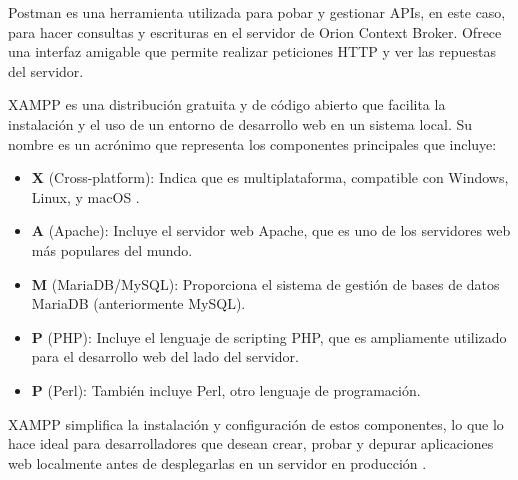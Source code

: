
\begin{comment}
Esta parte de la memoria tiene como objetivo presentar las técnicas metodológicas y las herramientas de desarrollo que se han utilizado para llevar a cabo el proyecto. Si se han estudiado diferentes alternativas de metodologías, herramientas, bibliotecas se puede hacer un resumen de los aspectos más destacados de cada alternativa, incluyendo comparativas entre las distintas opciones y una justificación de las elecciones realizadas. 
No se pretende que este apartado se convierta en un capítulo de un libro dedicado a cada una de las alternativas, sino comentar los aspectos más destacados de cada opción, con un repaso somero a los fundamentos esenciales y referencias bibliográficas para que el lector pueda ampliar su conocimiento sobre el tema.
\end{comment}


Postman es una herramienta utilizada para pobar y gestionar APIs, en este caso, para hacer consultas y escrituras en el servidor de Orion Context Broker. Ofrece una interfaz amigable que permite realizar peticiones HTTP y ver las repuestas del servidor.


XAMPP es una distribución gratuita y de código abierto que facilita la instalación y el uso de un entorno de desarrollo web en un sistema local. Su nombre es un acrónimo que representa los componentes principales que incluye: 

\begin{itemize}
    \item \textbf{X} (Cross-platform): Indica que es multiplataforma, compatible con Windows, Linux, y macOS \cite{xampp}.
    \item \textbf{A} (Apache): Incluye el servidor web Apache, que es uno de los servidores web más populares del mundo.
    \item \textbf{M} (MariaDB/MySQL): Proporciona el sistema de gestión de bases de datos MariaDB (anteriormente MySQL).
    \item \textbf{P} (PHP): Incluye el lenguaje de scripting PHP, que es ampliamente utilizado para el desarrollo web del lado del servidor.
    \item \textbf{P} (Perl): También incluye Perl, otro lenguaje de programación.
\end{itemize}

XAMPP simplifica la instalación y configuración de estos componentes, lo que lo hace ideal para desarrolladores que desean crear, probar y depurar aplicaciones web localmente antes de desplegarlas en un servidor en producción \cite{xamppdocs}.

